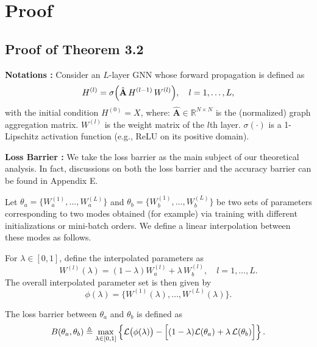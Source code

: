 

\section{Proof}
\subsection{Proof of Theorem 3.2}\label{the:3.2}
\noindent\textbf{Notations :} \: Consider an \(L\)-layer GNN whose forward propagation is defined as
\begin{equation}
  H^{(l)} = \sigma\Bigl(\hat{\mathbf{A}}\,H^{(l-1)}\,W^{(l)}\Bigr), \quad l=1,\dots,L,
  \label{eq:forward1}
\end{equation}
with the initial condition \(H^{(0)} = X\), where:  \(\hat{\mathbf{A}} \in \mathbb{R}^{N\times N}\) is the (normalized) graph aggregation matrix.
\(W^{(l)}\) is the weight matrix of the \(l\)th layer. \(\sigma(\cdot)\) is a 1-Lipschitz activation function (e.g., ReLU on its positive domain).

\noindent\textbf{Loss Barrier :}  We take the loss barrier as the main subject of our theoretical analysis. In fact, discussions on both the loss barrier and the accuracy barrier can be found in Appendix E.


Let \(\theta_a = \{W_a^{(1)}, \dots, W_a^{(L)}\}\) and \(\theta_b = \{W_b^{(1)}, \dots, W_b^{(L)}\}\) be two sets of parameters corresponding to two modes obtained (for example) via training with different initializations or mini-batch orders. We define a linear interpolation between these modes as follows.

\begin{definition}
For \(\lambda \in [0,1]\), define the interpolated parameters as
\begin{equation}
  W^{(l)}(\lambda) = (1-\lambda)W_a^{(l)} + \lambda\,W_b^{(l)}, \quad l=1,\dots,L.
\end{equation}
The overall interpolated parameter set is then given by
\[
\phi(\lambda) = \{W^{(1)}(\lambda), \dots, W^{(L)}(\lambda)\}.
\]
\end{definition}

\begin{definition}
The loss barrier between \(\theta_a\) and \(\theta_b\) is defined as
\begin{equation}
  B(\theta_a,\theta_b) \triangleq \max_{\lambda\in [0,1]} \left\{ \mathcal{L}\bigl(\phi(\lambda)\bigr) - \Bigl[(1-\lambda)\mathcal{L}(\theta_a) + \lambda\,\mathcal{L}(\theta_b)\Bigr] \right\}.
\end{equation}
\end{definition}

